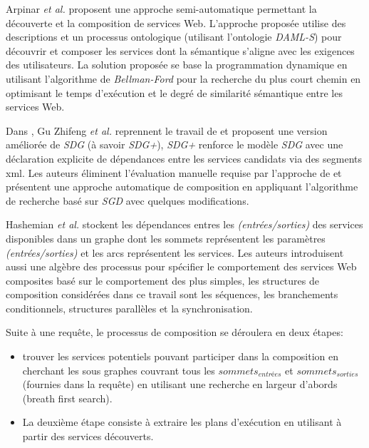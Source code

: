   Arpinar \textit{et al.} \cite{arpinar2005ontology} proposent une
  approche semi-automatique permettant la découverte et la composition
  de services Web. L'approche proposée utilise des descriptions et un
  processus ontologique (utilisant l'ontologie \textit{DAML-S}) pour
  découvrir et composer les services dont la sémantique s'aligne avec
  les exigences des utilisateurs. La solution proposée se base la
  programmation dynamique en utilisant l'algorithme de
  \textit{Bellman-Ford} pour la recherche du plus court chemin en
  optimisant le temps d'exécution et le degré de similarité sémantique
  entre les services Web.\bigskip

  Dans \cite{gu2008automatic}, Gu Zhifeng \textit{et al.} reprennent
  le travail de \cite{liang2005and} et proposent une version améliorée
  de \textit{SDG} (à savoir \textit{SDG+}), \textit{SDG+} renforce le
  modèle \textit{SDG} avec une déclaration explicite de dépendances
  entre les services candidats via des segments \acrshort{xml}. Les
  auteurs éliminent l'évaluation manuelle requise par l'approche de
  \cite{liang2005and} et présentent une approche automatique de
  composition en appliquant l'algorithme de recherche basé sur
  \textit{SGD} avec quelques modifications.\bigskip

  Hashemian \textit{et al.} \cite{hashemian2006graph} stockent les
  dépendances entres les \textit{(entrées/sorties)} des services
  disponibles dans un graphe dont les sommets représentent les
  paramètres \textit{(entrées/sorties)} et les arcs représentent les
  services. Les auteurs introduisent aussi une algèbre des processus
  pour spécifier le comportement des services Web composites basé sur
  le comportement des plus simples, les structures de composition
  considérées dans ce travail sont les séquences, les branchements
  conditionnels, structures parallèles et la synchronisation.

  Suite à une requête, le processus de composition se déroulera en
  deux étapes:

  \SpecialItem
  \begin{itemize}
  \item trouver les services potentiels pouvant participer dans la
    composition en cherchant les sous graphes couvrant tous les
    $sommets_{entrées}$ et $sommets_{sorties}$ (fournies dans la
    requête) en utilisant une recherche en largeur d'abords (breath
    first search).

  \item La deuxième étape consiste à extraire les plans d'exécution en
    utilisant à partir des services découverts.\bigskip
  \end{itemize}

